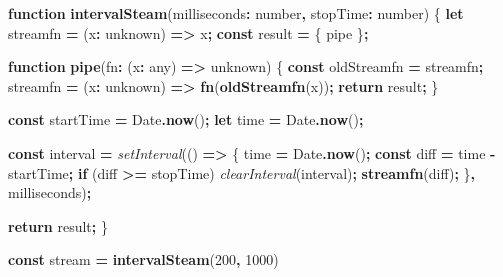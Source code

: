 \documentclass[
  openany]{book}
\newenvironment{Shaded}{\begin{snugshade}}{\end{snugshade}}
\newcommand{\BuiltInTok}[1]{#1}
\newcommand{\ControlFlowTok}[1]{\textcolor[rgb]{0.13,0.29,0.53}{\textbf{#1}}}
\newcommand{\DataTypeTok}[1]{\textcolor[rgb]{0.13,0.29,0.53}{#1}}
\newcommand{\DecValTok}[1]{\textcolor[rgb]{0.00,0.00,0.81}{#1}}
\newcommand{\FunctionTok}[1]{\textcolor[rgb]{0.13,0.29,0.53}{\textbf{#1}}}
\newcommand{\KeywordTok}[1]{\textcolor[rgb]{0.13,0.29,0.53}{\textbf{#1}}}
\newcommand{\NormalTok}[1]{#1}
\newcommand{\OperatorTok}[1]{\textcolor[rgb]{0.81,0.36,0.00}{\textbf{#1}}}
\newcommand{\PreprocessorTok}[1]{\textcolor[rgb]{0.56,0.35,0.01}{\textit{#1}}}
\theoremstyle{definition}
\theoremstyle{definition}
\theoremstyle{definition}
\theoremstyle{definition}
\theoremstyle{remark}
\begin{document}
\begin{Shaded}
\begin{Highlighting}[]
\KeywordTok{function} \FunctionTok{intervalSteam}\NormalTok{(milliseconds}\OperatorTok{:} \DataTypeTok{number}\OperatorTok{,}\NormalTok{ stopTime}\OperatorTok{:} \DataTypeTok{number}\NormalTok{) \{}
  \KeywordTok{let}\NormalTok{ streamfn }\OperatorTok{=}\NormalTok{ (x}\OperatorTok{:} \DataTypeTok{unknown}\NormalTok{) }\KeywordTok{=\textgreater{}}\NormalTok{ x}\OperatorTok{;}
  \KeywordTok{const}\NormalTok{ result }\OperatorTok{=}\NormalTok{ \{ pipe \}}\OperatorTok{;}

  \KeywordTok{function} \FunctionTok{pipe}\NormalTok{(fn}\OperatorTok{:}\NormalTok{ (x}\OperatorTok{:} \DataTypeTok{any}\NormalTok{) }\KeywordTok{=\textgreater{}} \DataTypeTok{unknown}\NormalTok{) \{}
    \KeywordTok{const}\NormalTok{ oldStreamfn }\OperatorTok{=}\NormalTok{ streamfn}\OperatorTok{;}
\NormalTok{    streamfn }\OperatorTok{=}\NormalTok{ (x}\OperatorTok{:} \DataTypeTok{unknown}\NormalTok{) }\KeywordTok{=\textgreater{}} \FunctionTok{fn}\NormalTok{(}\FunctionTok{oldStreamfn}\NormalTok{(x))}\OperatorTok{;}
    \ControlFlowTok{return}\NormalTok{ result}\OperatorTok{;}
\NormalTok{  \}}

  \KeywordTok{const}\NormalTok{ startTime }\OperatorTok{=} \BuiltInTok{Date}\OperatorTok{.}\FunctionTok{now}\NormalTok{()}\OperatorTok{;}
  \KeywordTok{let}\NormalTok{ time }\OperatorTok{=} \BuiltInTok{Date}\OperatorTok{.}\FunctionTok{now}\NormalTok{()}\OperatorTok{;}

  \KeywordTok{const}\NormalTok{ interval }\OperatorTok{=} \PreprocessorTok{setInterval}\NormalTok{(() }\KeywordTok{=\textgreater{}}\NormalTok{ \{}
\NormalTok{    time }\OperatorTok{=} \BuiltInTok{Date}\OperatorTok{.}\FunctionTok{now}\NormalTok{()}\OperatorTok{;}
    \KeywordTok{const}\NormalTok{ diff }\OperatorTok{=}\NormalTok{ time }\OperatorTok{{-}}\NormalTok{ startTime}\OperatorTok{;}
    \ControlFlowTok{if}\NormalTok{ (diff }\OperatorTok{\textgreater{}=}\NormalTok{ stopTime) }\PreprocessorTok{clearInterval}\NormalTok{(interval)}\OperatorTok{;}
    \FunctionTok{streamfn}\NormalTok{(diff)}\OperatorTok{;}
\NormalTok{  \}}\OperatorTok{,}\NormalTok{ milliseconds)}\OperatorTok{;}

  \ControlFlowTok{return}\NormalTok{ result}\OperatorTok{;}
\NormalTok{\}}

\KeywordTok{const}\NormalTok{ stream }\OperatorTok{=} \FunctionTok{intervalSteam}\NormalTok{(}\DecValTok{200}\OperatorTok{,} \DecValTok{1000}\NormalTok{)}



\end{Highlighting}
\end{Shaded}
\end{document}
